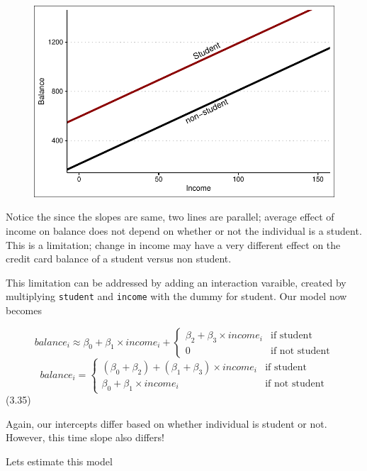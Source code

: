 \documentclass[
  letterpaper,
  DIV=11,
  numbers=noendperiod]{scrreprt}
\begin{document}
\begin{figure}[H]

{\centering \includegraphics{Chapter3_files/figure-pdf/unnamed-chunk-80-1.pdf}

}

\end{figure}

Notice the since the slopes are same, two lines are parallel; average
effect of income on balance does not depend on whether or not the
individual is a student. This is a limitation; change in income may have
a very different effect on the credit card balance of a student versus
non student.

This limitation can be addressed by adding an interaction varaible,
created by multiplying \texttt{student} and \texttt{income} with the
dummy for student. Our model now becomes

\[
balance_i \approx \beta_0 + \beta_1 \times income_i + 
\begin{cases}
\beta_2 + \beta_3 \times income_i & \text{if student} \\
0 & \text{if not student}
\end{cases}
\] \[
balance_i = 
\begin{cases}
(\beta_0 + \beta_2) + (\beta_1 + \beta_3) \times income_i & \text{if student} \\
\beta_0 + \beta_1 \times income_i & \text{if not student}
\end{cases}
\] (3.35)

Again, our intercepts differ based on whether individual is student or
not. However, this time slope also differs!

Lets estimate this model
\end{document}
